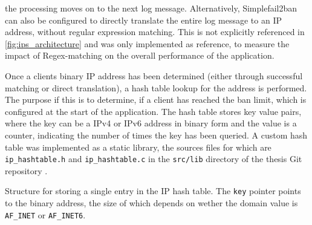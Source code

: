 the processing moves on to the next log message. Alternatively, Simplefail2ban can also be configured to directly translate the entire log message to an \ac{IP} address, without regular expression matching.
This is not explicitly referenced in \ref{fig:ips_architecture} and was only implemented as reference, to measure the impact of \ac{Regex}-matching on the overall performance of the application.
\par
Once a clients binary \ac{IP} address has been determined (either through successful matching or direct translation), a hash table lookup for the address is performed.
The purpose if this is to determine, if a client has reached the ban limit, which is configured at the start of the application. 
The hash table stores key value pairs, where the key can be a \ac{IPv4} or \ac{IPv6} address in binary form and the value is a counter,
indicating the number of times the key has been queried. A custom hash table was implemented as a static library, the sources files for which are \texttt{ip\_hashtable.h}
and \texttt{ip\_hashtable.c} in the \texttt{src/lib} directory of the thesis Git repository \cite{gitlab}. 

\begin{algorithm}[h!]
    
    \caption[IP Hash Table]{Structure for storing a single entry in the IP hash table. The \texttt{key} pointer 
    points to the binary address, the size of which depends on wether the domain value is \texttt{AF\_INET} or \texttt{AF\_INET6}.}
    \label{alg:ip_hashtable}
\end{algorithm}


